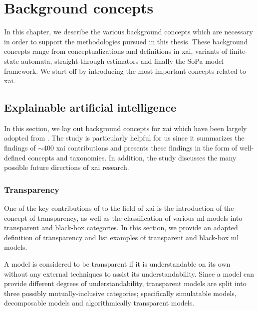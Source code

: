 \chapter{Background concepts}

\label{chapter:background}

In this chapter, we describe the various background concepts which are necessary
in order to support the methodologies pursued in this thesis. These background
concepts range from conceptualizations and definitions in \ac{xai}, variants of
finite-state automata, straight-through estimators and finally the SoPa model
framework. We start off by introducing the most important concepts related to
\ac{xai}.

\section{Explainable artificial intelligence}

\label{section:xai}

In this section, we lay out background concepts for \ac{xai} which have been
largely adopted from \citet{arrieta2020explainable}. The study is particularly
helpful for us since it summarizes the findings of $\sim$400 \ac{xai}
contributions and presents these findings in the form of well-defined concepts
and taxonomies. In addition, the study discusses the many possible future
directions of \ac{xai} research.

\subsection{Transparency}

One of the key contributions of \citet{arrieta2020explainable} to the field of
\ac{xai} is the introduction of the concept of transparency, as well as the
classification of various \ac{ml} models into transparent and
black-box categories. In this section, we provide an adapted definition of
transparency and list examples of transparent and black-box \ac{ml} models.

\begin{definition}
  A model is considered to be transparent if it is understandable on its own
  without any external techniques to assist its understandability. Since a model
  can provide different degrees of understandability, transparent models are
  split into three possibly mutually-inclusive categories; specifically
  simulatable models, decomposable models and algorithmically transparent
  models.
\end{definition}

